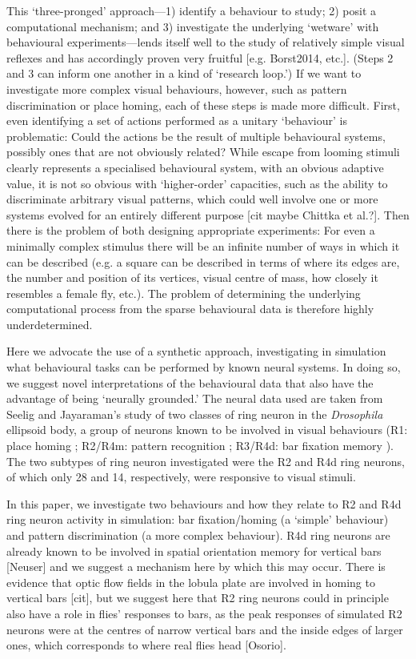This `three-pronged' approach---1) identify a behaviour to study; 2) posit a computational mechanism; and 3) investigate the underlying `wetware' with behavioural experiments---lends itself well to the study of relatively simple visual reflexes and has accordingly proven very fruitful [e.g. Borst2014, etc.].
(Steps 2 and 3 can inform one another in a kind of `research loop.')
If we want to investigate more complex visual behaviours, however, such as pattern discrimination or place homing, each of these steps is made more difficult.
First, even identifying a set of actions performed as a unitary `behaviour' is problematic: Could the actions be the result of multiple behavioural systems, possibly ones that are not obviously related?
While escape from looming stimuli clearly represents a specialised behavioural system, with an obvious adaptive value, it is not so obvious with `higher-order' capacities, such as the ability to discriminate arbitrary visual patterns, which could well involve one or more systems evolved for an entirely different purpose [cit maybe Chittka et al.?].
Then there is the problem of both designing appropriate experiments:
For even a minimally complex stimulus there will be an infinite number of ways in which it can be described (e.g. a square can be described in terms of where its edges are, the number and position of its vertices, visual centre of mass, how closely it resembles a female fly, etc.).
The problem of determining the underlying computational process from the sparse behavioural data is therefore highly underdetermined.

Here we advocate the use of a synthetic approach, investigating in simulation what behavioural tasks can be performed by known neural systems.
In doing so, we suggest novel interpretations of the behavioural data that also have the advantage of being `neurally grounded.'
The neural data used are taken from Seelig and Jayaraman's \cite{Seelig2013} study of two classes of ring neuron in the \emph{Drosophila} ellipsoid body, a group of neurons known to be involved in visual behaviours (R1: place homing \cite{Ofstad2011,Sitaraman2010,Sitaraman2008}; R2/R4m: pattern recognition \cite{Pan2009,Liu2006,Ernst1999}; R3/R4d: bar fixation memory \cite{Neuser2008}).
The two subtypes of ring neuron investigated were the R2 and R4d ring neurons, of which only 28 and 14, respectively, were responsive to visual stimuli.

In this paper, we investigate two behaviours and how they relate to R2 and R4d ring neuron activity in simulation: bar fixation/homing (a `simple' behaviour) and pattern discrimination (a more complex behaviour).
R4d ring neurons are already known to be involved in spatial orientation memory for vertical bars [Neuser] and we suggest a mechanism here by which this may occur.
There is evidence that optic flow fields in the lobula plate are involved in homing to vertical bars [cit], but we suggest here that R2 ring neurons could in principle also have a role in flies' responses to bars, as the peak responses of simulated R2 neurons were at the centres of narrow vertical bars and the inside edges of larger ones, which corresponds to where real flies head [Osorio].

